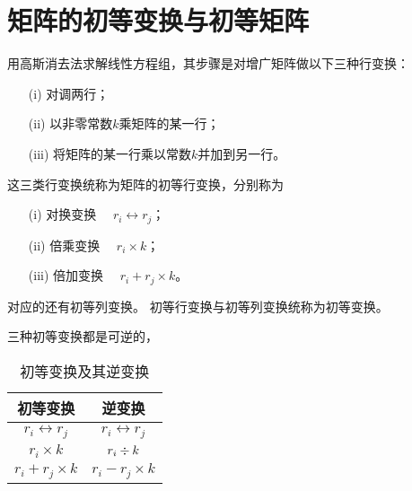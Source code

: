 \section{矩阵的初等变换与初等矩阵}

\begin{frame}\ft{\secname}
用高斯消去法求解线性方程组，其步骤是对增广矩阵做以下三种行变换：
\begin{itemize}
        \item[(i)] 对调两行；
        \item[(ii)] 以非零常数$k$乘矩阵的某一行；
        \item[(iii)] 将矩阵的某一行乘以常数$k$并加到另一行。
\end{itemize}
这三类行变换统称为\textcolor{acolor3}{矩阵的初等行变换}，\pause 分别称为
\begin{itemize}
        \item[(i)] \textcolor{acolor3}{对换变换}  $\quad r_i \leftrightarrow r_j$；
        \item[(ii)] \textcolor{acolor3}{倍乘变换}       $\quad r_i \times k$；
        \item[(iii)] \textcolor{acolor3}{倍加变换} $\quad r_i + r_j \times k $。
\end{itemize}
\pause 对应的还有\textcolor{acolor3}{初等列变换}。 \pause \textcolor{acolor1}{初等行变换与初等列变换统称为初等变换。}
\end{frame}


\begin{frame}\ft{\secname}
三种初等变换都是可逆的，
\begin{table}[htbp]
        \centering
        \begin{tabular}{|c|c|} \hline
                初等变换 &  逆变换 \\\hline
                $r_i \leftrightarrow r_j$ & $r_i \leftrightarrow r_j$ \\[0.2cm]\hline
                $r_i \times k$ & $\displaystyle r_i \div k$ \\[0.2cm]\hline
                $r_i + r_j \times k$ & $r_i - r_j\times k$ \\[0.2cm]\hline
        \end{tabular}
        \caption{初等变换及其逆变换}
\end{table}

\end{frame}


